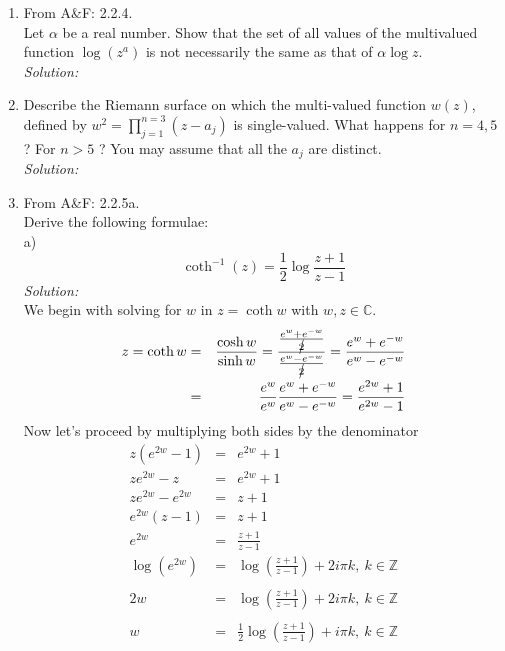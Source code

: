 \documentclass[10pt]{amsart}
\theoremstyle{nonumberplain}
\begin{document}
\begin{enumerate}[label={\bf {\arabic*}:}]
\item From A\&F: 2.2.4. \\
Let $\alpha$ be a real number.
Show that the set of all values of the multivalued function $\log(z^a)$ is not necessarily the same as that of $\alpha \log z$. \\
\textit{Solution:} \\
\item Describe the Riemann surface on which the multi-valued function
  $w(z)$, defined by $w^2=\prod_{j=1}^{n=3}\left(z-a_j\right)$ is
  single-valued. What happens for $n=4,5$ ? For $n>5$ ? You may assume
  that all the $a_j$ are distinct.\\
\textit{Solution:} \\
\item From A\&F: 2.2.5a. \\
Derive the following formulae: \\
a) $$\coth^{-1}(z) = \frac{1}{2}\log\frac{z + 1}{z - 1}$$
\textit{Solution:} \\
We begin with solving for $w$ in $z = \coth{w}$ with $w, z \in \mathbb{C}$. 
\begin{eqnarray*}
z = \coth{w} &=& \frac{\cosh w}{\sinh w} = \frac{ \frac{e^{w} + e^{-w}}{\cancel{2}} }{ \frac{e^{w} - e^{-w}}{\cancel{2}} } = \frac{ e^{w} + e^{-w} }{ e^{w} - e^{-w} } \\
	  &=& \frac{e^{w}}{e^{w}} \frac{ e^{w} + e^{-w} }{ e^{w} - e^{-w} } = \frac{ e^{2w} + 1}{ e^{2w} - 1 }
\end{eqnarray*}
Now let's proceed by multiplying both sides by the denominator
\begin{eqnarray*}
z\left( e^{2w} - 1\right) &=&  e^{2w} + 1\\
ze^{2w} - z &=&  e^{2w} + 1\\
ze^{2w} - e^{2w} &=& z + 1\\
e^{2w}(z - 1) &=& z + 1\\
e^{2w} &=& \frac{z + 1}{z - 1 }\\
\log \left(e^{2w}\right) &=& \log \left(\frac{z + 1}{z - 1} \right) + 2i\pi k, \: k \in \mathbb{Z} \\ \\
2w &=& \log \left(\frac{z + 1}{z - 1} \right) + 2i\pi k, \: k \in \mathbb{Z} \\ \\
w &=& \frac{1}{2}\log \left(\frac{z + 1}{z - 1} \right) + i\pi k, \: k \in \mathbb{Z} \\

\end{eqnarray*}
\end{enumerate}
\end{document}
